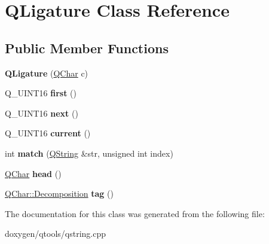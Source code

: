 \hypertarget{class_q_ligature}{}\section{Q\+Ligature Class Reference}
\label{class_q_ligature}
\subsection*{Public Member Functions}
\begin{DoxyCompactItemize}
\item 
\mbox{\label{class_q_ligature_a269bb8ce39458d45cd6d6c426b4a1b04}} 
{\bfseries Q\+Ligature} (\mbox{\hyperlink{class_q_char}{Q\+Char}} c)
\item 
\mbox{\label{class_q_ligature_ac97dca8db22afea0597fbc6d93aa3717}} 
Q\+\_\+\+U\+I\+N\+T16 {\bfseries first} ()
\item 
\mbox{\label{class_q_ligature_a4c5625ffff3cd46cdf96302fcaae5e45}} 
Q\+\_\+\+U\+I\+N\+T16 {\bfseries next} ()
\item 
\mbox{\label{class_q_ligature_a2e60f65343fb746ee88295bcafe27be2}} 
Q\+\_\+\+U\+I\+N\+T16 {\bfseries current} ()
\item 
\mbox{\label{class_q_ligature_a6c74c0f797d2303654ccdb31c931f8f4}} 
int {\bfseries match} (\mbox{\hyperlink{class_q_string}{Q\+String}} \&str, unsigned int index)
\item 
\mbox{\label{class_q_ligature_a43be235a69445f6e763afd6c76b7d381}} 
\mbox{\hyperlink{class_q_char}{Q\+Char}} {\bfseries head} ()
\item 
\mbox{\label{class_q_ligature_a96bc73f166717cb92a409e0a80230469}} 
\mbox{\hyperlink{class_q_char_a13be45046e82a6d2991cef0b7c18d522}{Q\+Char\+::\+Decomposition}} {\bfseries tag} ()
\end{DoxyCompactItemize}


The documentation for this class was generated from the following file\+:\begin{DoxyCompactItemize}
\item 
doxygen/qtools/qstring.\+cpp\end{DoxyCompactItemize}

